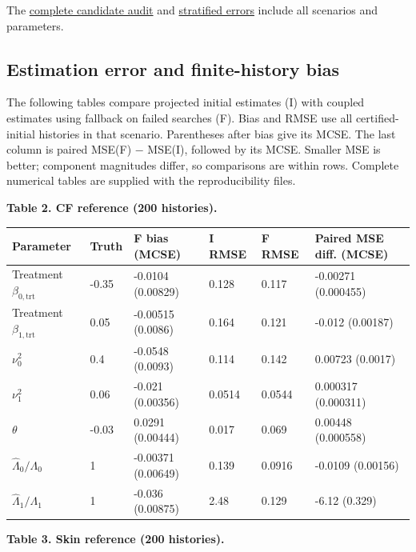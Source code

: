 \documentclass[11pt]{article}
\begin{document}
The \href{../results/manuscript_v09/candidate_summary.csv}{complete candidate audit} and \href{../results/manuscript_v09/active_hazard_errors.csv}{stratified errors} include all scenarios and parameters.

\subsection{Estimation error and finite-history bias}\label{sec:6.4}

The following tables compare projected initial estimates (I) with coupled estimates using fallback on failed searches (F). Bias and RMSE use all certified-initial histories in that scenario. Parentheses after bias give its MCSE. The last column is paired MSE(F) $-$ MSE(I), followed by its MCSE. Smaller MSE is better; component magnitudes differ, so comparisons are within rows. Complete numerical tables are supplied with the reproducibility files.

\label{tab:2}
\textbf{Table 2. CF reference (200 histories).}

{\scriptsize
\begin{longtable}{llllll}
\toprule
\textbf{Parameter} & \textbf{Truth} & \textbf{F bias (MCSE)} & \textbf{I RMSE} & \textbf{F RMSE} & \textbf{Paired MSE diff. (MCSE)} \\
\midrule
\endhead
\bottomrule
\endlastfoot
Treatment \(\beta_{0,\mathrm{trt}}\) & -0.35 & -0.0104 (0.00829) & 0.128 & 0.117 & -0.00271 (0.000455) \\
Treatment \(\beta_{1,\mathrm{trt}}\) & 0.05 & -0.00515 (0.0086) & 0.164 & 0.121 & -0.012 (0.00187) \\
\(\nu_0^2\) & 0.4 & -0.0548 (0.0093) & 0.114 & 0.142 & 0.00723 (0.0017) \\
\(\nu_1^2\) & 0.06 & -0.021 (0.00356) & 0.0514 & 0.0544 & 0.000317 (0.000311) \\
\(\theta\) & -0.03 & 0.0291 (0.00444) & 0.017 & 0.069 & 0.00448 (0.000558) \\
\(\widehat\Lambda_0/\Lambda_0\) & 1 & -0.00371 (0.00649) & 0.139 & 0.0916 & -0.0109 (0.00156) \\
\(\widehat\Lambda_1/\Lambda_1\) & 1 & -0.036 (0.00875) & 2.48 & 0.129 & -6.12 (0.329) \\
\end{longtable}}

\label{tab:3}
\textbf{Table 3. Skin reference (200 histories).}
\end{document}
